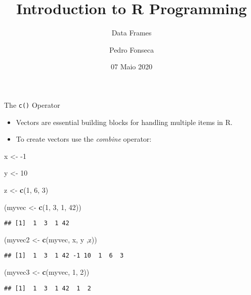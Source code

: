 \documentclass[ignorenonframetext,]{beamer}
\title{Introduction to R Programming}
\subtitle{Data Frames}
\author{Pedro Fonseca}
\date{07 Maio 2020}
\newenvironment{Shaded}{\begin{snugshade}}{\end{snugshade}}
\newcommand{\DecValTok}[1]{\textcolor[rgb]{0.00,0.00,0.81}{#1}}
\newcommand{\KeywordTok}[1]{\textcolor[rgb]{0.13,0.29,0.53}{\textbf{#1}}}
\newcommand{\NormalTok}[1]{#1}
\newcommand{\StringTok}[1]{\textcolor[rgb]{0.31,0.60,0.02}{#1}}
\begin{document}
\frame{\titlepage}

\begin{frame}[fragile]{The \texttt{c()} Operator}
\protect\hypertarget{the-c-operator}{}

\begin{itemize}
\item
  Vectors are essential building blocks for handling multiple items in
  R.
\item
  To create vectors use the \emph{combine} operator:
\end{itemize}

\begin{Shaded}
\begin{Highlighting}[]
\NormalTok{x <-}\StringTok{  }\DecValTok{-1}

\NormalTok{y <-}\StringTok{  }\DecValTok{10}

\NormalTok{z <-}\StringTok{  }\KeywordTok{c}\NormalTok{(}\DecValTok{1}\NormalTok{, }\DecValTok{6}\NormalTok{, }\DecValTok{3}\NormalTok{)}

\NormalTok{(myvec <-}\StringTok{ }\KeywordTok{c}\NormalTok{(}\DecValTok{1}\NormalTok{, }\DecValTok{3}\NormalTok{, }\DecValTok{1}\NormalTok{, }\DecValTok{42}\NormalTok{))}
\end{Highlighting}
\end{Shaded}

\begin{verbatim}
## [1]  1  3  1 42
\end{verbatim}

\begin{Shaded}
\begin{Highlighting}[]
\NormalTok{(myvec2 <-}\StringTok{ }\KeywordTok{c}\NormalTok{(myvec, x, y ,z))}
\end{Highlighting}
\end{Shaded}

\begin{verbatim}
## [1]  1  3  1 42 -1 10  1  6  3
\end{verbatim}

\begin{Shaded}
\begin{Highlighting}[]
\NormalTok{(myvec3 <-}\StringTok{  }\KeywordTok{c}\NormalTok{(myvec, }\DecValTok{1}\NormalTok{, }\DecValTok{2}\NormalTok{))}
\end{Highlighting}
\end{Shaded}

\begin{verbatim}
## [1]  1  3  1 42  1  2
\end{verbatim}

\end{frame}
\end{document}
